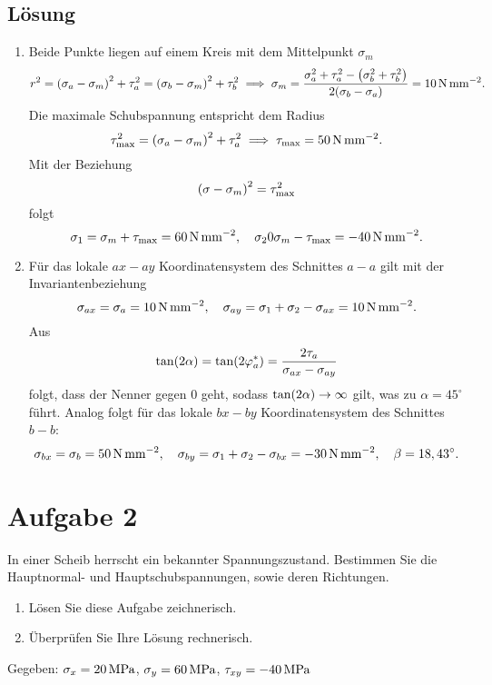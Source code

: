 \documentclass{exercise}
\begin{document}
    \subsection*{Lösung}
    \begin{enumerate}
        \item Beide Punkte liegen auf einem Kreis mit dem Mittelpunkt \(\sigma_m\)
        \[
            r^2 = \parentheses*{\sigma_a - \sigma_m}^2 + \tau_a^2 = \parentheses*{\sigma_b - \sigma_m}^2 + \tau_b^2 \implies \sigma_m = \frac{\sigma_a^2 + \tau_a^2 - \parentheses*{\sigma_b^2 + \tau_b^2}}{2\parentheses*{\sigma_b - \sigma_a}} = 10\sis{\newton\per\milli\meter\squared}.
        \]
        Die maximale Schubspannung entspricht dem Radius
        \[
            \tau_{\text{max}}^2 = \parentheses*{\sigma_a - \sigma_m}^2 + \tau_a^2 \implies \tau_{\text{max}} = 50\sis{\newton\per\milli\meter\squared}.
        \]
        Mit der Beziehung
        \[
            \parentheses*{\sigma - \sigma_m}^2 = \tau_{\text{max}}^2
        \]
        folgt
        \[
            \sigma_1 = \sigma_m + \tau_{\text{max}} = 60\sis{\newton\per\milli\meter\squared}, \quad \sigma_2 0 \sigma_m - \tau_{\text{max}} = -40\sis{\newton\per\milli\meter\squared}.
        \]
        \item Für das lokale \(ax-ay\) Koordinatensystem des Schnittes \(a-a\) gilt mit der Invariantenbeziehung
        \[
            \sigma_{ax} = \sigma_a = 10\sis{\newton\per\milli\meter\squared}, \quad \sigma_{ay} = \sigma_1 + \sigma_2 - \sigma_{ax} = 10\sis{\newton\per\milli\meter\squared}.
        \]
        Aus
        \[
            \tan\parentheses*{2\alpha} = \tan\parentheses*{2\varphi_a^*} = \frac{2\tau_a}{\sigma_{ax} - \sigma_{ay}}
        \]
        folgt, dass der Nenner gegen \(0\) geht, sodass \(\tan\parentheses*{2\alpha} \to \infty\) gilt, was zu \(\alpha = 45^\circ\) führt.
        Analog folgt für das lokale \(bx-by\) Koordinatensystem des Schnittes \(b-b\):
        \[
            \sigma_{bx} = \sigma_b = 50\sis{\newton\per\milli\meter\squared}, \quad \sigma_{by} = \sigma_1 + \sigma_2 - \sigma_{bx} = -30\sis{\newton\per\milli\meter\squared}, \quad \beta = 18,43^\circ.
        \]
    \end{enumerate}


    \clearpage
    \section*{Aufgabe 2}

    \begin{problem}
        In einer Scheib herrscht ein bekannter Spannungszustand.
        Bestimmen Sie die Hauptnormal- und Hauptschubspannungen, sowie deren Richtungen.
        \begin{enumerate}
            \item Lösen Sie diese Aufgabe zeichnerisch.
            \item Überprüfen Sie Ihre Lösung rechnerisch.
        \end{enumerate}
        Gegeben: \(\sigma_x = 20\sis{\mega\pascal}\), \(\sigma_y = 60\sis{\mega\pascal}\), \(\tau_{xy} = -40\sis{\mega\pascal}\)
    \end{problem}
\end{document}
